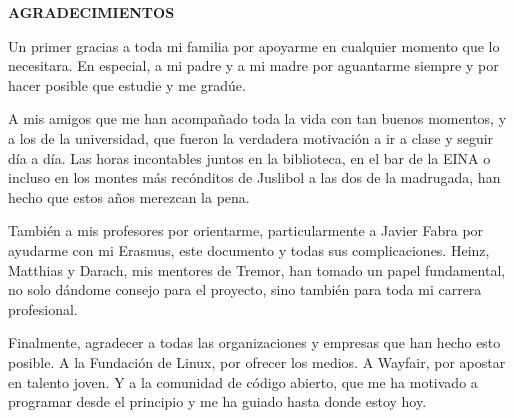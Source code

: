 
\begin{center}
{\LARGE \bfseries AGRADECIMIENTOS}
\vspace{2.5cm}
\end{center}

Un primer gracias a toda mi familia por apoyarme en cualquier momento que lo
necesitara. En especial, a mi padre y a mi madre por aguantarme siempre y por
hacer posible que estudie y me gradúe.

A mis amigos que me han acompañado toda la vida con tan buenos momentos, y a los
de la universidad, que fueron la verdadera motivación a ir a clase y seguir día
a día. Las horas incontables juntos en la biblioteca, en el bar de la EINA o
incluso en los montes más recónditos de Juslibol a las dos de la madrugada, han
hecho que estos años merezcan la pena.

También a mis profesores por orientarme, particularmente a Javier Fabra por
ayudarme con mi Erasmus, este documento y todas sus complicaciones. Heinz,
Matthias y Darach, mis mentores de Tremor, han tomado un papel fundamental, no
solo dándome consejo para el proyecto, sino también para toda mi carrera
profesional.

Finalmente, agradecer a todas las organizaciones y empresas que han hecho esto
posible. A la Fundación de Linux, por ofrecer los medios. A Wayfair, por apostar
en talento joven. Y a la comunidad de código abierto, que me ha motivado a
programar desde el principio y me ha guiado hasta donde estoy hoy.
